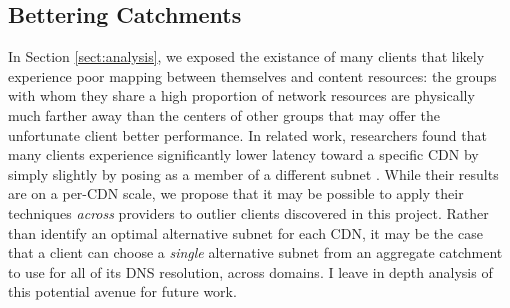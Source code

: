 \subsection{Bettering Catchments}

In Section \ref{sect:analysis}, we exposed the existance of many clients that
likely experience poor mapping between themselves and content resources: the
groups with whom they share a high proportion of network resources are
physically much farther away than the centers of other groups that may offer the
unfortunate client better performance. In related work, researchers found that
many clients experience significantly lower latency toward a specific CDN by
simply slightly by posing as a member of a different subnet \cite{warrior2017drongo}. While their results
are on a per-CDN scale, we propose that it may be possible to apply their
techniques \emph{across} providers to outlier clients discovered in this
project. Rather than identify an optimal alternative subnet for each CDN, it may
be the case that a client can choose a \emph{single} alternative subnet from an
aggregate catchment to use for all of its DNS resolution, across domains. I
leave in depth analysis of this potential avenue for future work.
